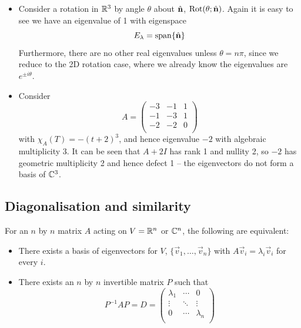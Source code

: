 \documentclass{../../template/note}
\begin{document}
\begin{example}
\begin{itemize}
            \item Consider a rotation in \(\mathbb R^3\) by angle \(\theta\) about \(\hvec n\), \(\Rot(\theta; \hvec n)\). Again it is easy to see we have an eigenvalue of 1 with eigenspace
            \[
                E_\lambda = \Span \{\hvec n\}
            \]
            Furthermore, there are no other real eigenvalues unless \(\theta = n\pi\), since we reduce to the 2D rotation case, where we already know the eigenvalues are \(e^{\pm i \theta}\).
            \item Consider
            \[
                A = \begin{pmatrix}
                 -3 & -1 & 1 \\
                 -1 & -3 & 1 \\
                 -2 & -2 & 0 \\
                \end{pmatrix}
            \]
            with \(\chi_A(T) = -(t+2)^3\), and hence eigenvalue \(-2\) with algebraic multiplicity 3. It can be seen that \(A + 2I\) has rank 1 and nullity 2, so \(-2\) has geometric multiplicity 2 and hence defect 1 -- the eigenvectors do not form a basis of \(\mathbb C^3\).
        \end{itemize}
    \end{example}
    
    \subsection{Diagonalisation and similarity}

    \begin{proposition}
        For an \(n\) by \(n\) matrix \(A\) acting on \(V = \mathbb R^n\) or \(\mathbb C^n\), the following are equivalent:
        \begin{itemize}
            \item There exists a basis of eigenvectors for \(V\), \(\{\vec v_1, \dots, \vec v_n\}\) with \(A\vec v_i = \lambda_i \vec v_i\) for every \(i\).
            \item There exists an \(n\) by \(n\) invertible matrix \(P\) such that
            \[
                P^{-1}AP = D = \begin{pmatrix}
                 \lambda_1 & \cdots & 0 \\
                 \vdots & \ddots & \vdots \\
                 0 & \cdots & \lambda_n \\
                \end{pmatrix}
            \]
        \end{itemize}
        \label{diagonalisability-conditions}
    \end{proposition}
    
\end{document}
